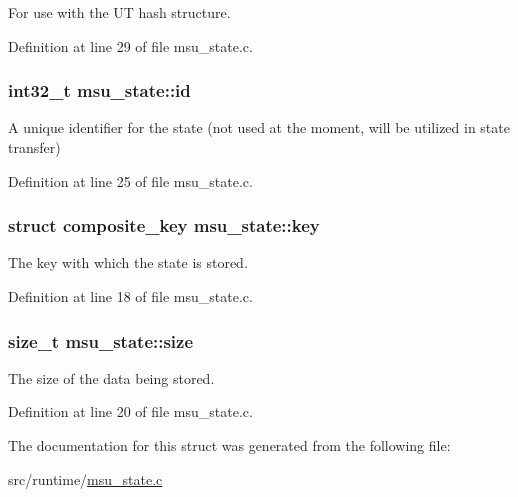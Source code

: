 For use with the U\-T hash structure. 



Definition at line 29 of file msu\-\_\-state.\-c.

\hypertarget{structmsu__state_a9ce5b8e3cf4774a8920c01b02c54c5a1}{
\subsubsection[{id}]{\setlength{\rightskip}{0pt plus 5cm}int32\-\_\-t msu\-\_\-state\-::id}}\label{structmsu__state_a9ce5b8e3cf4774a8920c01b02c54c5a1}


A unique identifier for the state (not used at the moment, will be utilized in state transfer) 



Definition at line 25 of file msu\-\_\-state.\-c.

\hypertarget{structmsu__state_a847e9475d17bba6d22da32d9400be11a}{
\subsubsection[{key}]{\setlength{\rightskip}{0pt plus 5cm}struct {\bf composite\-\_\-key} msu\-\_\-state\-::key}}\label{structmsu__state_a847e9475d17bba6d22da32d9400be11a}


The key with which the state is stored. 



Definition at line 18 of file msu\-\_\-state.\-c.

\hypertarget{structmsu__state_a6fb5d739fe1877967cb59624fa454157}{
\subsubsection[{size}]{\setlength{\rightskip}{0pt plus 5cm}size\-\_\-t msu\-\_\-state\-::size}}\label{structmsu__state_a6fb5d739fe1877967cb59624fa454157}


The size of the data being stored. 



Definition at line 20 of file msu\-\_\-state.\-c.



The documentation for this struct was generated from the following file\-:\begin{DoxyCompactItemize}
\item 
src/runtime/\hyperlink{msu__state_8c}{msu\-\_\-state.\-c}\end{DoxyCompactItemize}

